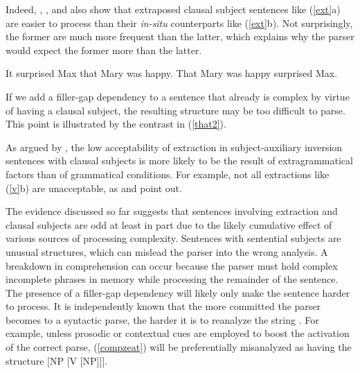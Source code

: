 \documentclass[output=paper
 	        ,biblatex
                ,babelshorthands
                ,newtxmath
                ,draftmode
                ,colorlinks, citecolor=brown
]{langscibook}
\begin{document}
\eal  \label{exps}
\zl


\noindent
Indeed, \citet{fodor67}, \citet{bever}, and \citet{frazier88} also show that extraposed clausal
subject sentences like (\ref{ext}a) are easier to process than their \textit{in-situ} counterparts
like (\ref{ext}b).  Not surprisingly, the former are much more frequent than the latter, which
explains why the parser would expect the former more than the latter.


\eal  \label{ext}
\ex It surprised Max that Mary was happy. 
\ex That Mary was happy surprised Max.
\zl

  
If we add a filler-gap dependency to a sentence that already is complex by virtue of having a
clausal subject, the resulting structure may be too difficult to parse.  This point is illustrated
by the contrast in (\ref{that2}).



\eal \label{that2}
\zl


\noindent
As argued by \citet{dubinsky2009}, the low acceptability of extraction in subject-auxiliary
inversion sentences with clausal subjects is more likely to be the result of extragrammatical
factors than of grammatical conditions.  For example, not all extractions like (\ref{v}b) are
unacceptable, as \citet[382--387]{delahunty} and \citet[115]{dubinsky2009} point out.

\eal \label{v}
\zl

The evidence discussed so far suggests that sentences involving extraction and clausal subjects are
odd at least in part due to the likely cumulative effect of various sources of processing
complexity.  Sentences with sentential subjects are unusual structures, which can mislead the parser
into the wrong analysis. A breakdown in comprehension can occur because the parser must hold complex
incomplete phrases in memory while processing the remainder of the sentence. The presence of a
filler-gap dependency will likely only make the sentence harder to process.  It is independently
known that the more committed the parser becomes to a syntactic parse, the harder it is to reanalyze
the string \citep{ferreirahend,ferreirahend2,tabor3}.  For example, unless prosodic or contextual
cues are employed to boost the activation of the correct parse, (\ref{compzeat}) will be
preferentially misanalyzed as having the structure [NP [V [NP]]].
\end{document}
